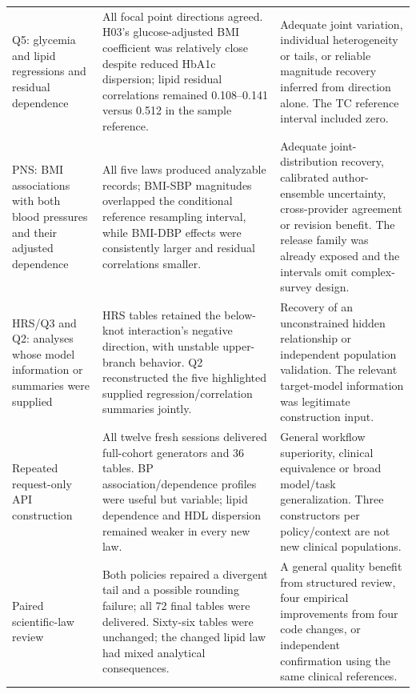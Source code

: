 \documentclass[11pt,letterpaper]{article}
\begin{document}
\begin{xltabular}{\linewidth}{@{}>{\raggedright\arraybackslash}X>{\raggedright\arraybackslash}X>{\raggedright\arraybackslash}X@{}}
Q5: glycemia and lipid regressions and residual dependence & All focal point directions agreed. H03's glucose-adjusted BMI coefficient was relatively close despite reduced HbA1c dispersion; lipid residual correlations remained 0.108–\allowbreak{}0.141 versus 0.512 in the sample reference. & Adequate joint variation, individual heterogeneity or tails, or reliable magnitude recovery inferred from direction alone. The TC reference interval included zero. \\

PNS: BMI associations with both blood pressures and their adjusted dependence & All five laws produced analyzable records; BMI-SBP magnitudes overlapped the conditional reference resampling interval, while BMI-DBP effects were consistently larger and residual correlations smaller. & Adequate joint-distribution recovery, calibrated author-ensemble uncertainty, cross-provider agreement or revision benefit. The release family was already exposed and the intervals omit complex-survey design. \\

HRS/\allowbreak{}Q3 and Q2: analyses whose model information or summaries were supplied & HRS tables retained the below-knot interaction's negative direction, with unstable upper-branch behavior. Q2 reconstructed the five highlighted supplied regression/\allowbreak{}correlation summaries jointly. & Recovery of an unconstrained hidden relationship or independent population validation. The relevant target-model information was legitimate construction input. \\

Repeated request-only API construction & All twelve fresh sessions delivered full-cohort generators and 36 tables. BP association/\allowbreak{}dependence profiles were useful but variable; lipid dependence and HDL dispersion remained weaker in every new law. & General workflow superiority, clinical equivalence or broad model/\allowbreak{}task generalization. Three constructors per policy/\allowbreak{}context are not new clinical populations. \\

Paired scientific-law review & Both policies repaired a divergent tail and a possible rounding failure; all 72 final tables were delivered. Sixty-six tables were unchanged; the changed lipid law had mixed analytical consequences. & A general quality benefit from structured review, four empirical improvements from four code changes, or independent confirmation using the same clinical references. \\

\end{xltabular}
\end{document}
